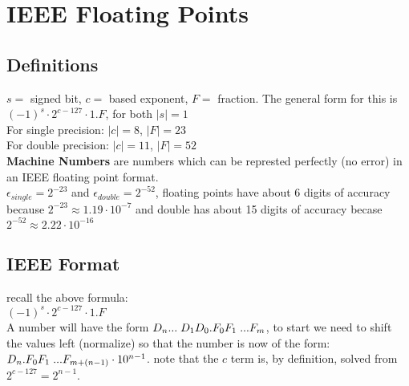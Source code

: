 \section{IEEE Floating Points}
\subsection*{Definitions}
$s = $ signed bit, $c =$ based exponent, $F =$ fraction. The general form
for this is $(-1)^s \cdot 2^{c - 127} \cdot 1.F$, for both $|s| = 1$\\
For single precision: $|c| = 8$, $|F| = 23$\\
For double precision: $|c| = 11$, $|F| = 52$\\
\textbf{Machine Numbers} are numbers which can be represted perfectly (no error)
in an IEEE floating point format.\\
$\epsilon_{single} = 2^{-23}$ and $\epsilon_{double} = 2^{-52}$, floating points have
about 6 digits of accuracy because $2^{-23} \approx 1.19 \cdot 10^{-7}$ and double
has about 15 digits of accuracy becase $2^{-52} \approx 2.22 \cdot 10^{-16}$

\subsection*{IEEE Format}
recall the above formula:\\
$(-1)^s \cdot 2^{c - 127} \cdot 1.F$\\
A number will have the form $D_n ... \hspace{1mm} D_1 D_0 . F_0 F_1 \hspace{1mm} ... F_m$,
to start we need to shift the values left (normalize) so that the number is now
of the form: $D_n . F_0 F_1 \hspace{1mm} ... F_{m + (n-1)} \cdot 10^{n-1}$.
note that the $c$ term is, by definition, solved from $2^{c - 127} = 2^{n-1}$.


